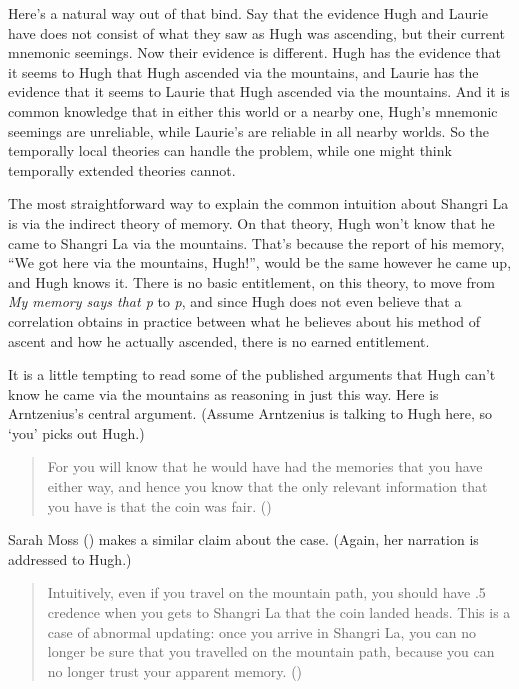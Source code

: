 \documentclass[
  11pt,
  letterpaper,
  DIV=11,
  numbers=noendperiod,
  twoside]{scrartcl}
\begin{document}
Here's a natural way out of that bind. Say that the evidence Hugh and
Laurie have does not consist of what they saw as Hugh was ascending, but
their current mnemonic seemings. Now their evidence is different. Hugh
has the evidence that it seems to Hugh that Hugh ascended via the
mountains, and Laurie has the evidence that it seems to Laurie that Hugh
ascended via the mountains. And it is common knowledge that in either
this world or a nearby one, Hugh's mnemonic seemings are unreliable,
while Laurie's are reliable in all nearby worlds. So the temporally
local theories can handle the problem, while one might think temporally
extended theories cannot.

The most straightforward way to explain the common intuition about
Shangri La is via the indirect theory of memory. On that theory, Hugh
won't know that he came to Shangri La via the mountains. That's because
the report of his memory, ``We got here via the mountains, Hugh!'',
would be the same however he came up, and Hugh knows it. There is no
basic entitlement, on this theory, to move from \emph{My memory says
that p} to \emph{p}, and since Hugh does not even believe that a
correlation obtains in practice between what he believes about his
method of ascent and how he actually ascended, there is no earned
entitlement.

It is a little tempting to read some of the published arguments that
Hugh can't know he came via the mountains as reasoning in just this way.
Here is Arntzenius's central argument. (Assume Arntzenius is talking to
Hugh here, so `you' picks out Hugh.)

\begin{quote}
For you will know that he would have had the memories that you have
either way, and hence you know that the only relevant information that
you have is that the coin was fair.
()
\end{quote}

Sarah Moss () makes a similar claim about
the case. (Again, her narration is addressed to Hugh.)

\begin{quote}
Intuitively, even if you travel on the mountain path, you should have .5
credence when you gets to Shangri La that the coin landed heads. This is
a case of abnormal updating: once you arrive in Shangri La, you can no
longer be sure that you travelled on the mountain path, because you can
no longer trust your apparent memory. ()
\end{quote}
\end{document}
